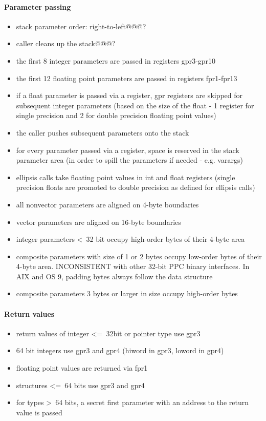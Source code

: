 \paragraph{Parameter passing}

\begin{itemize}
\item stack parameter order: right-to-left@@@?
\item caller cleans up the stack@@@?
\item the first 8 integer parameters are passed in registers gpr3-gpr10
\item the first 12 floating point parameters are passed in registers fpr1-fpr13
\item if a float parameter is passed via a register, gpr registers are skipped for subsequent integer parameters (based on the size of
the float - 1 register for single precision and 2 for double precision floating point values)
\item the caller pushes subsequent parameters onto the stack
\item for every parameter passed via a register, space is reserved in the stack parameter area (in order to spill the parameters if
needed - e.g. varargs)
\item ellipsis calls take floating point values in int and float registers (single precision floats are promoted to double precision
as defined for ellipsis calls)
\item all nonvector parameters are aligned on 4-byte boundaries
\item vector parameters are aligned on 16-byte boundaries
\item integer parameters \textless\ 32 bit occupy high-order bytes of their 4-byte area
\item composite parameters with size of 1 or 2 bytes occupy low-order bytes of their 4-byte area. INCONSISTENT with other 32-bit PPC
binary interfaces. In AIX and OS 9, padding bytes always follow the data structure
\item composite parameters 3 bytes or larger in size occupy high-order bytes
\end{itemize}


\paragraph{Return values}

\begin{itemize}
\item return values of integer \textless=\ 32bit or pointer type use gpr3
\item 64 bit integers use gpr3 and gpr4 (hiword in gpr3, loword in gpr4)
\item floating point values are returned via fpr1
\item structures \textless=\ 64 bits use gpr3 and gpr4
\item for types \textgreater\ 64 bits, a secret first parameter with an address to the return value is passed
\end{itemize}

